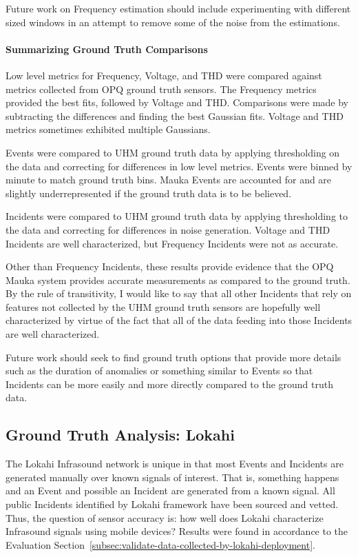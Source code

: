 Future work on Frequency estimation should include experimenting with different sized windows in an attempt to remove some of the noise from the estimations.

\paragraph{Summarizing Ground Truth Comparisons}

Low level metrics for Frequency, Voltage, and THD were compared against metrics collected from OPQ ground truth sensors. The Frequency metrics provided the best fits, followed by Voltage and THD. Comparisons were made by subtracting the differences and finding the best Gaussian fits. Voltage and THD metrics sometimes exhibited multiple Gaussians.

Events were compared to UHM ground truth data by applying thresholding on the data and correcting for differences in low level metrics. Events were binned by minute to match ground truth bins. Mauka Events are accounted for and are slightly underrepresented if the ground truth data is to be believed.

Incidents were compared to UHM ground truth data by applying thresholding to the data and correcting for differences in noise generation. Voltage and THD Incidents are well characterized, but Frequency Incidents were not as accurate.

Other than Frequency Incidents, these results provide evidence that the OPQ Mauka system provides accurate measurements as compared to the ground truth. By the rule of transitivity, I would like to say that all other Incidents that rely on features not collected by the UHM ground truth sensors are hopefully well characterized by virtue of the fact that all of the data feeding into those Incidents are well characterized.

Future work should seek to find ground truth options that provide more details such as the duration of anomalies or something similar to Events so that Incidents can be more easily and more directly compared to the ground truth data.

\subsection{Ground Truth Analysis: Lokahi}\label{subsec:ground-truth-analysis:-lokahi}

The Lokahi Infrasound network is unique in that most Events and Incidents are generated manually over known signals of interest. That is, something happens and an Event and possible an Incident are generated from a known signal. All public Incidents identified by Lokahi framework have been sourced and vetted. Thus, the question of sensor accuracy is: how well does Lokahi characterize Infrasound signals using mobile devices? Results were found in accordance to the Evaluation Section~\ref{subsec:validate-data-collected-by-lokahi-deployment}.

